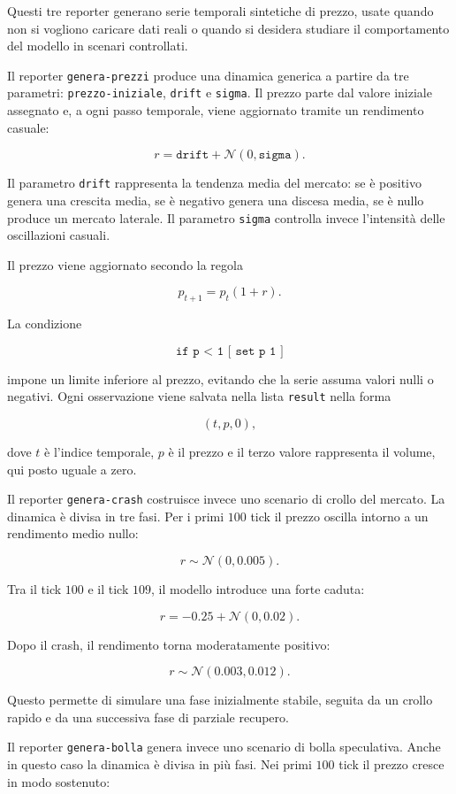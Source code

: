 Questi tre reporter generano serie temporali sintetiche di prezzo, usate quando
non si vogliono caricare dati reali o quando si desidera studiare il comportamento
del modello in scenari controllati.

Il reporter \texttt{genera-prezzi} produce una dinamica generica a partire da tre
parametri: \texttt{prezzo-iniziale}, \texttt{drift} e \texttt{sigma}. Il prezzo
parte dal valore iniziale assegnato e, a ogni passo temporale, viene aggiornato
tramite un rendimento casuale:

\[
r = \texttt{drift} + \mathcal{N}(0,\texttt{sigma}).
\]

Il parametro \texttt{drift} rappresenta la tendenza media del mercato: se è
positivo genera una crescita media, se è negativo genera una discesa media, se è
nullo produce un mercato laterale. Il parametro \texttt{sigma} controlla invece
l'intensità delle oscillazioni casuali.

Il prezzo viene aggiornato secondo la regola

\[
p_{t+1}=p_t(1+r).
\]

La condizione

\[
\texttt{if p < 1 [ set p 1 ]}
\]

impone un limite inferiore al prezzo, evitando che la serie assuma valori nulli o
negativi. Ogni osservazione viene salvata nella lista \texttt{result} nella forma

\[
(t,p,0),
\]

dove \(t\) è l'indice temporale, \(p\) è il prezzo e il terzo valore rappresenta
il volume, qui posto uguale a zero.

Il reporter \texttt{genera-crash} costruisce invece uno scenario di crollo del
mercato. La dinamica è divisa in tre fasi. Per i primi \(100\) tick il prezzo
oscilla intorno a un rendimento medio nullo:

\[
r \sim \mathcal{N}(0,0.005).
\]

Tra il tick \(100\) e il tick \(109\), il modello introduce una forte caduta:

\[
r = -0.25 + \mathcal{N}(0,0.02).
\]

Dopo il crash, il rendimento torna moderatamente positivo:

\[
r \sim \mathcal{N}(0.003,0.012).
\]

Questo permette di simulare una fase inizialmente stabile, seguita da un crollo
rapido e da una successiva fase di parziale recupero.

Il reporter \texttt{genera-bolla} genera invece uno scenario di bolla
speculativa. Anche in questo caso la dinamica è divisa in più fasi. Nei primi
\(100\) tick il prezzo cresce in modo sostenuto:

